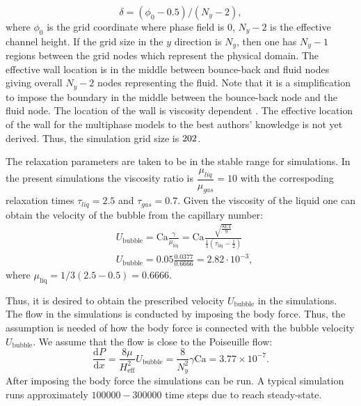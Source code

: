 \documentclass[preprint,12pt]{elsarticle}
\newcommand{\Ca}{\mathrm{Ca}}
\begin{document}
{\begin{description}
\begin{equation}
\delta=(\phi_0-0.5)/(N_y-2),
\end{equation}
where $\phi_0$ is the grid coordinate where phase field is $0$, $N_y-2$
is the effective channel height.
If the grid size in the $y$ direction is $N_y$, then one has $N_y-1$ regions between the grid nodes
which represent
the physical domain. The effective wall location is in the middle between bounce-back and fluid
nodes giving
overall $N_y-2$ nodes representing the fluid. Note that it is a simplification to impose the
boundary in the middle between the bounce-back
node and the fluid node. The location of the wall is
viscosity dependent \cite{ginzburg-multireflection}.  The effective location of the
wall for the
multiphase models to the best authors' knowledge is not yet derived. Thus, the simulation grid size
is $202\time 3000$. 
 \item[Velocity] The relaxation parameters are taken to be in the stable range for simulations.
In the present simulations the viscosity ratio is $\dfrac{\mu_{liq}}{\mu_{gas}}=10$ with the
correspoding relaxation times $\tau_{liq}=2.5$ and $\tau_{gas}=0.7$. Given the viscosity of the
liquid one can obtain the velocity of the bubble from the capillary number: 
\begin{equation}
\begin{aligned}
&U_{\mathrm{bubble}}=\Ca \frac{\gamma}{\mu_{\mathrm{liq}}}=\Ca \frac{\sqrt{\frac{8 k
A}{9}}}{\frac{1}{3}(\tau_{\mathrm{liq}}-\frac{1}{2})}\\
&U_{\mathrm{bubble}}=0.05 \frac{0.0377}{0.6666}=2.82 \cdot10^{-3},
\end{aligned}
\end{equation}
where $\mu_{\mathrm{liq}}=1/3 (2.5-0.5)=0.6666$.
\item[Body force] 
Thus, it is desired to obtain the prescribed velocity $U_{\mathrm{bubble}}$ in the simulations. The
flow in the simulations is conducted by imposing the body force. Thus, the assumption is needed of
how the body force is connected with the bubble velocity $U_{\mathrm{bubble}}$. We assume that the
flow is close to the Poiseuille flow:
\begin{equation}
\frac{\mathrm{d}P}{\mathrm{d}x}=\frac{8\mu}{H_{\mathrm{eff}}^2}
U_{\mathrm{bubble}}=\frac{8}{N_y^2}\gamma \Ca=3.77\times 10^{-7}.  
\end{equation}
After imposing the body force the simulations can be run. A typical simulation runs approximately
$100000-300000$ time steps due to reach steady-state.

\end{description}}
\end{document}
